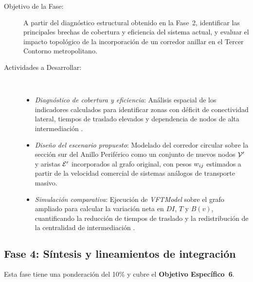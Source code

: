 \begin{description}
    \item[Objetivo de la Fase:] A partir del diagnóstico estructural obtenido en
    la Fase~2, identificar las principales brechas de cobertura y eficiencia del
    sistema actual, y evaluar el impacto topológico de la incorporación de un
    corredor anillar en el Tercer Contorno metropolitano.

    \item[Actividades a Desarrollar:]~
    \begin{itemize}
        \item \textit{Diagnóstico de cobertura y eficiencia}: Análisis espacial de
        los indicadores calculados para identificar zonas con déficit de conectividad
        lateral, tiempos de traslado elevados y dependencia de nodos de alta
        intermediación \parencite{mishra2012, ugur2025}.
        \item \textit{Diseño del escenario propuesto}: Modelado del corredor circular
        sobre la sección sur del Anillo Periférico como un conjunto de nuevos nodos
        $\mathcal{V}'$ y aristas $\mathcal{E}'$ incorporados al grafo original, con pesos
        $w_{ij}$ estimados a partir de la velocidad comercial de sistemas
        análogos de transporte masivo.
        \item \textit{Simulación comparativa}: Ejecución de \textit{VFTModel} sobre
        el grafo ampliado para calcular la variación neta en $DI$, $T$ y $B(v)$,
        cuantificando la reducción de tiempos de traslado y la redistribución de la
        centralidad de intermediación \parencite{cabrera2026VFTModel}.
    \end{itemize}
\end{description}

\subsection{Fase 4: Síntesis y lineamientos de integración}
\label{subsec:fase4}

Esta fase tiene una ponderación del 10\% y cubre el \textbf{Objetivo Específico~6}.

